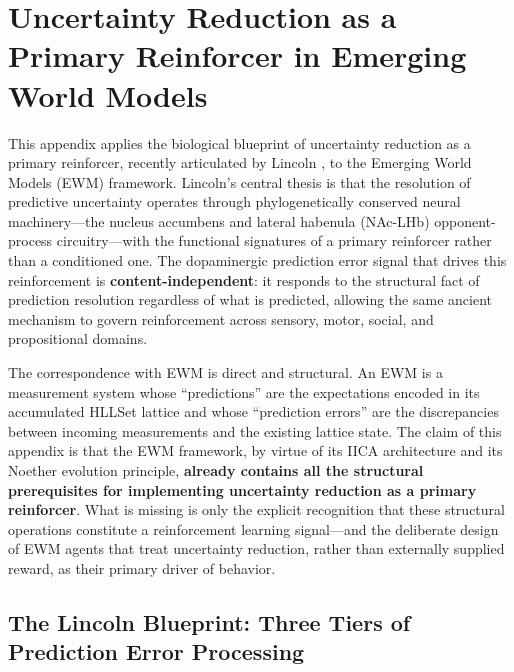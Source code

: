 \documentclass[11pt,a4paper]{article}
\theoremstyle{remark}
\begin{document}
\appendix
\section{Uncertainty Reduction as a Primary Reinforcer in Emerging World Models}
\label{sec:appendix-reinforcement}

This appendix applies the biological blueprint of uncertainty reduction as a
primary reinforcer, recently articulated by Lincoln \cite{lincoln2026}, to the
Emerging World Models (EWM) framework. Lincoln's central thesis is that the
resolution of predictive uncertainty operates through phylogenetically conserved
neural machinery---the nucleus accumbens and lateral habenula (NAc-LHb)
opponent-process circuitry---with the functional signatures of a primary
reinforcer rather than a conditioned one. The dopaminergic prediction error
signal that drives this reinforcement is \textbf{content-independent}: it
responds to the structural fact of prediction resolution regardless of what is
predicted, allowing the same ancient mechanism to govern reinforcement across
sensory, motor, social, and propositional domains.

The correspondence with EWM is direct and structural. An EWM is a measurement
system whose ``predictions'' are the expectations encoded in its accumulated
HLLSet lattice and whose ``prediction errors'' are the discrepancies between
incoming measurements and the existing lattice state. The claim of this appendix
is that the EWM framework, by virtue of its IICA architecture and its Noether
evolution principle, \textbf{already contains all the structural prerequisites
for implementing uncertainty reduction as a primary reinforcer}. What is
missing is only the explicit recognition that these structural operations
constitute a reinforcement learning signal---and the deliberate design of EWM
agents that treat uncertainty reduction, rather than externally supplied reward,
as their primary driver of behavior.

\subsection{The Lincoln Blueprint: Three Tiers of Prediction Error Processing}
\label{sec:lincoln-blueprint}
\end{document}
